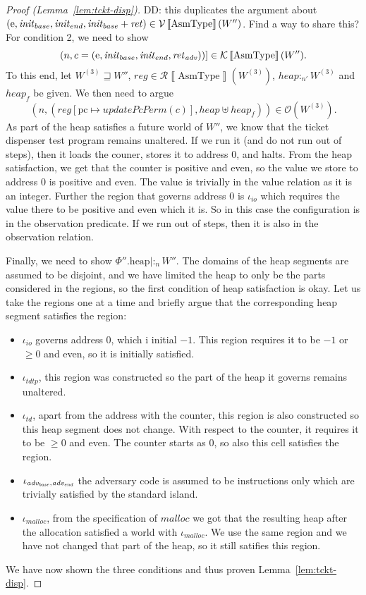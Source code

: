 \documentclass{article}
\newcommand{\update}[2]{[#1 \mapsto #2]}
\newcommand{\sem}[1]{\left\llbracket #1 \right\rrbracket}
\newcommand\dominique[1]{{\color{purple} \sf \footnotesize {DD: #1}}}
\newcommand{\var}[1]{\mathit{#1}}
\newcommand{\pcreg}{\mathrm{pc}}
\newcommand{\reg}{\var{reg}}
\newcommand{\heap}{\var{heap}}
\newcommand{\plainproj}[1]{\mathrm{#1}}
\newcommand{\memheap}[1][\Phi]{#1.\plainproj{heap}}
\newcommand{\plainfun}[1]{\mathit{#1}}
\newcommand{\updatePcPerm}[1]{\plainfun{updatePcPerm}(#1)}
\newcommand{\future}{\mathbin{\sqsupseteq}}
\newcommand{\heapSat}[3][\heap]{#1 :_{#2} #3}
\newcommand{\codelabel}[1]{\mathit{#1}}
\newcommand{\malloc}{\codelabel{malloc}}
\newcommand{\asmType}{\plaindom{AsmType}}
\newcommand{\plaindom}[1]{\mathrm{#1}}
\newcommand{\intr}[2]{\mathcal{#1}\sem{#2}}
\newcommand{\valueintr}[1]{\intr{V}{#1}}
\newcommand{\contintr}[1]{\intr{K}{#1}}
\newcommand{\regintr}[1]{\intr{R}{#1}}
\newcommand{\stdvr}{\valueintr{\asmType}}
\newcommand{\stdrr}{\regintr{\asmType}}
\newcommand{\stdkr}{\contintr{\asmType}}
\newcommand{\observations}{\mathcal{O}}
\newcommand{\npair}[2][n]{\left(#1,#2 \right)}
\newcommand{\plainperm}[1]{\mathrm{#1}}
\newcommand{\entry}{\plainperm{e}}
\begin{document}
\begin{proof}[Proof (Lemma~\ref{lem:tckt-disp})]
\dominique{this duplicates the argument about $(\entry,\initb,\inite,\initb+\var{ret}) \in \stdvr(W'')$. Find a way to share this?}
For condition 2, we need to show 
\[
\npair{c = (\entry, \initb, \inite,\reta)}] \in \stdkr(W'').
\]
To this end, let $W^{(3)} \future W''$, $\reg \in \stdrr(W^{(3)})$, $\heapSat[\heap]{n'}{W^{(3)}}$ and $\heap_f$ be given. We then need to argue 
\[
\npair{(\reg\update{\pcreg}{\updatePcPerm{c}},\heap \uplus \heap_f)} \in \observations(W^{(3)}).
\]
As part of the heap satisfies a future world of $W''$, we know that the ticket dispenser test program remains unaltered. If we run it (and do not run out of steps), then it loads the couner, stores it to address $0$, and halts. From the heap satisfaction, we get that the counter is positive and even, so the value we store to address 0 is positive and even. The value is trivially in the value relation as it is an integer. Further the region that governs address 0 is $\iota_{\var{io}}$ which requires the value there to be positive and even which it is. So in this case the configuration is in the observation predicate. If we run out of steps, then it is also in the observation relation.

Finally, we need to show $\heapSat[{\memheap[\Phi'']}|]{n}{W''}$. The domains of the heap segments are assumed to be disjoint, and we have limited the heap to only be the parts considered in the regions, so the first condition of heap satisfaction is okay. Let us take the regions one at a time and briefly argue that the corresponding heap segment satisfies the region:
\begin{itemize}
\item $\iota_{\var{io}}$ governs address 0, which i initial $-1$. This region requires it to be $-1$ or $\geq 0$ and even, so it is initially satisfied.
\item $\iota_{\var{tdtp}}$, this region was constructed so the part of the heap it governs remains unaltered.
\item $\iota_{\var{td}}$, apart from the address with the counter, this region is also constructed so this heap segment does not change. With respect to the counter, it requires it to be $\geq 0$ and even. The counter starts as 0, so also this cell satisfies the region.
\item $\iota_{\advb,\adve}$ the adversary code is assumed to be instructions only which are trivially satisfied by the standard island.
\item $\iota_{\malloc}$, from the specification of $\malloc$ we got that the resulting heap after the allocation satisfied a world with $\iota_{\malloc}$. We use the same region and we have not changed that part of the heap, so it still satifies this region.
\end{itemize}

We have now shown the three conditions and thus proven Lemma~\ref{lem:tckt-disp}.
\end{proof}
\end{document}
